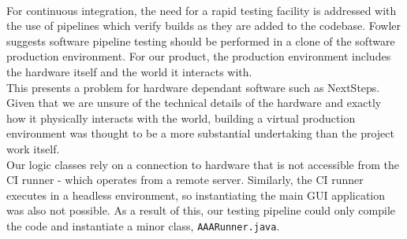 \documentclass{l3proj}
\begin{document}
\\ For continuous integration, the need for a rapid testing facility is addressed with the use of pipelines which verify builds as they are added to the codebase\cite{fowler1}. 
Fowler suggests software pipeline testing should be performed in a clone of the software production environment\cite{fowler2}. For our product, the production environment includes the hardware itself and the world it interacts with.
\\This presents a problem for hardware dependant software such as NextSteps. Given that we are unsure of the technical details of the hardware and exactly how it physically interacts with the world, building a virtual production environment was thought to be a more substantial undertaking than the project work itself. 
\\Our logic classes rely on a connection to hardware that is not accessible from the CI runner - which operates from a remote server. 
Similarly, the CI runner executes in a headless environment, so instantiating the main GUI application was also not possible. 
As a result of this, our testing pipeline could only compile the code and instantiate a minor class, \verb|AAARunner.java|. 
\end{document}
